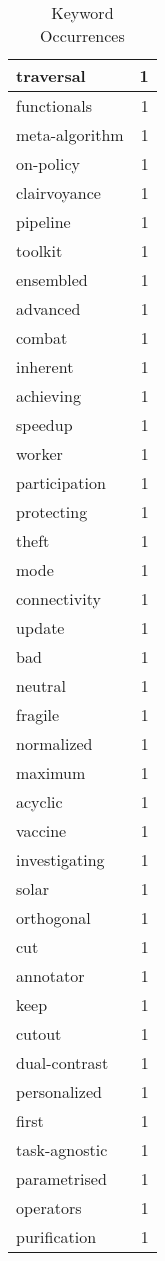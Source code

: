 \begin{table}[h]
\begin{tabular}{|l|r|}
\hline
traversal & 1 \\
\hline
functionals & 1 \\
\hline
meta-algorithm & 1 \\
\hline
on-policy & 1 \\
\hline
clairvoyance & 1 \\
\hline
pipeline & 1 \\
\hline
toolkit & 1 \\
\hline
ensembled & 1 \\
\hline
advanced & 1 \\
\hline
combat & 1 \\
\hline
inherent & 1 \\
\hline
achieving & 1 \\
\hline
speedup & 1 \\
\hline
worker & 1 \\
\hline
participation & 1 \\
\hline
protecting & 1 \\
\hline
theft & 1 \\
\hline
mode & 1 \\
\hline
connectivity & 1 \\
\hline
update & 1 \\
\hline
bad & 1 \\
\hline
neutral & 1 \\
\hline
fragile & 1 \\
\hline
normalized & 1 \\
\hline
maximum & 1 \\
\hline
acyclic & 1 \\
\hline
vaccine & 1 \\
\hline
investigating & 1 \\
\hline
solar & 1 \\
\hline
orthogonal & 1 \\
\hline
cut & 1 \\
\hline
annotator & 1 \\
\hline
keep & 1 \\
\hline
cutout & 1 \\
\hline
dual-contrast & 1 \\
\hline
personalized & 1 \\
\hline
first & 1 \\
\hline
task-agnostic & 1 \\
\hline
parametrised & 1 \\
\hline
operators & 1 \\
\hline
purification & 1 \\
\hline
\end{tabular}
\caption{Keyword Occurrences}
\end{table}
